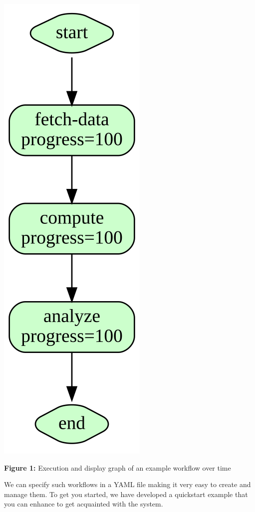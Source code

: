 \begin{longtable}[]
\includegraphics{images/workflow-example-5.svg} \\
\bottomrule
\end{longtable}

\textbf{Figure 1:} Execution and display graph of an example workflow
over time

We can specify such workflows in a YAML file making it very easy to
create and manage them. To get you started, we have developed a
quickstart example that you can enhance to get acquainted with the
system.

